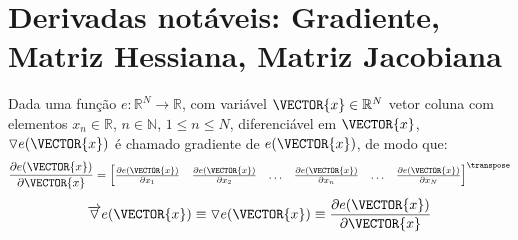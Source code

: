 
\section{Derivadas notáveis: Gradiente, Matriz Hessiana, Matriz Jacobiana}

\begin{proposition}\label{def:gradient}
 Dada uma função $e:\mathbb{R}^{N}\rightarrow \mathbb{R}$, com variável $\VECTOR{x} \in \mathbb{R}^{N}$
 vetor coluna com elementos $x_n\in \mathbb{R}$, $n\in \mathbb{N}$, $1 \leq n \leq N$,
 diferenciável em $\VECTOR{x}$, 
 $\triangledown e(\VECTOR{x})$ é chamado gradiente 
\cite[pp. 913]{stewart2008calculus} \cite[pp. 80]{telles2015matematica} \cite{Gradient}  de $e(\VECTOR{x})$, de modo que: 
\begin{equation}
\frac{\partial e(\VECTOR{x})}{\partial \VECTOR{x} }=
\left[
\begin{matrix}
\frac{\partial e(\VECTOR{x}) }{\partial x_{1}}&
\frac{\partial e(\VECTOR{x}) }{\partial x_{2}}&
\hdots&
\frac{\partial e(\VECTOR{x}) }{\partial x_{n}}&
\hdots&
\frac{\partial e(\VECTOR{x}) }{\partial x_{N}}
\end{matrix}
\right]^{\transpose}
 \end{equation}
\begin{equation}
\overrightarrow{\triangledown} e(\VECTOR{x})\equiv  
\triangledown e(\VECTOR{x}) \equiv 
\frac{\partial e(\VECTOR{x})}{\partial \VECTOR{x} }
\end{equation}
\end{proposition}



